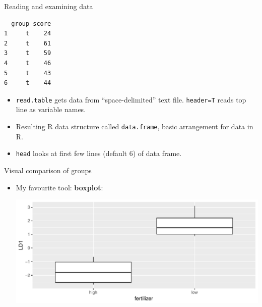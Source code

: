 \begin{frame}[fragile]{Reading and examining data}
  
 
\begin{knitrout}
\color{fgcolor}\begin{kframe}
\begin{alltt}
\hlkwb{=}\hlstd{(}\hlstd{,}
\end{alltt}
\begin{verbatim}
  group score
1     t    24
2     t    61
3     t    59
4     t    46
5     t    43
6     t    44
\end{verbatim}
\end{kframe}
\end{knitrout}

\begin{itemize}
\item \texttt{read.table} gets data from ``space-delimited'' text
  file. \texttt{header=T} reads top line as variable names.
\item Resulting R data structure called \texttt{data.frame}, basic
  arrangement for data in R.
\item \texttt{head} looks at first few lines (default 6) of data frame.
\end{itemize}

 
\end{frame}

\begin{frame}[fragile]{Visual comparison of groups}
  
  \begin{itemize}
  \item My favourite tool: \textbf{boxplot}:
    
\begin{knitrout}
\color{fgcolor}\begin{kframe}
\begin{alltt}
\hlkwb{=}\hlstd{(}\hlopt{+}\hlstd{()}
\end{alltt}
\end{kframe}
\includegraphics[width=\maxwidth]{figure/unnamed-chunk-8-1} 

\end{knitrout}
    

  \end{itemize}
  
\end{frame}



